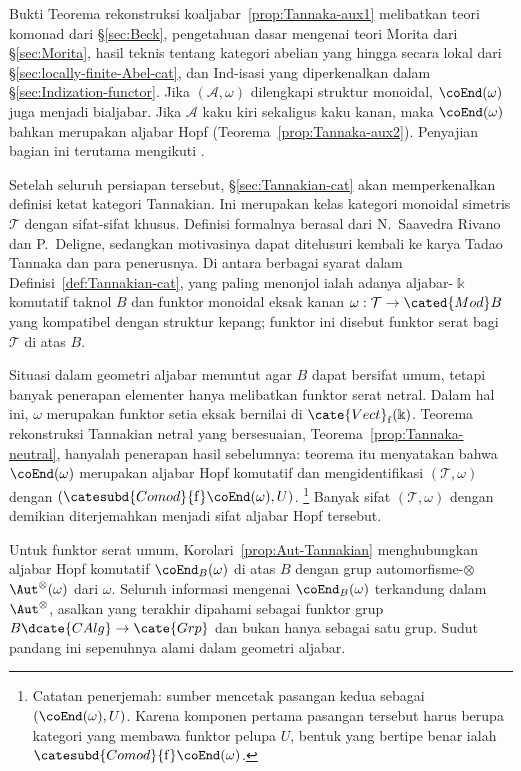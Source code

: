 Bukti Teorema rekonstruksi koaljabar~\ref{prop:Tannaka-aux1} melibatkan teori
komonad dari \S\ref{sec:Beck}, pengetahuan dasar mengenai teori Morita dari
\S\ref{sec:Morita}, hasil teknis tentang kategori abelian yang hingga secara lokal
dari \S\ref{sec:locally-finite-Abel-cat}, dan Ind-isasi yang diperkenalkan
dalam \S\ref{sec:Indization-functor}. Jika $(\mathcal{A},\omega)$ dilengkapi
struktur monoidal, $\coEnd(\omega)$ juga menjadi bialjabar. Jika
$\mathcal{A}$ kaku kiri sekaligus kaku kanan, maka $\coEnd(\omega)$ bahkan
merupakan aljabar Hopf (Teorema~\ref{prop:Tannaka-aux2}). Penyajian bagian ini
terutama mengikuti \cite{Del90}.

Setelah seluruh persiapan tersebut, \S\ref{sec:Tannakian-cat} akan
memperkenalkan definisi ketat kategori Tannakian. Ini merupakan kelas kategori
monoidal simetris $\mathcal{T}$ dengan sifat-sifat khusus. Definisi formalnya
berasal dari N.\ Saavedra Rivano dan P.\ Deligne, sedangkan motivasinya dapat
ditelusuri kembali ke karya Tadao Tannaka dan para penerusnya. Di antara
berbagai syarat dalam Definisi~\ref{def:Tannakian-cat}, yang paling menonjol
ialah adanya aljabar-$\Bbbk$ komutatif taknol $B$ dan funktor monoidal eksak
kanan
$\omega:\mathcal{T}\to\cated{Mod}B$ yang kompatibel dengan struktur kepang;
funktor ini disebut funktor serat bagi $\mathcal{T}$ di atas $B$.

Situasi dalam geometri aljabar menuntut agar $B$ dapat bersifat umum, tetapi
banyak penerapan elementer hanya melibatkan funktor serat netral. Dalam hal
ini, $\omega$ merupakan funktor setia eksak bernilai di
$\cate{Vect}_{\mathrm{f}}(\Bbbk)$. Teorema rekonstruksi Tannakian netral yang
bersesuaian, Teorema~\ref{prop:Tannaka-neutral}, hanyalah penerapan hasil
sebelumnya: teorema itu menyatakan bahwa $\coEnd(\omega)$ merupakan aljabar
Hopf komutatif dan mengidentifikasi $(\mathcal{T},\omega)$ dengan
$(\catesubd{Comod}{\mathrm{f}}\coEnd(\omega),U)$.
\footnote{Catatan penerjemah: sumber mencetak pasangan kedua sebagai
$(\coEnd(\omega),U)$. Karena komponen pertama pasangan tersebut harus berupa
kategori yang membawa funktor pelupa $U$, bentuk yang bertipe benar ialah
$\catesubd{Comod}{\mathrm{f}}\coEnd(\omega)$.}
Banyak sifat $(\mathcal{T},\omega)$ dengan demikian diterjemahkan menjadi
sifat aljabar Hopf tersebut.

Untuk funktor serat umum, Korolari~\ref{prop:Aut-Tannakian} menghubungkan
aljabar Hopf komutatif $\coEnd_B(\omega)$ di atas $B$ dengan grup
automorfisme-$\otimes$ $\Aut^\otimes(\omega)$ dari $\omega$. Seluruh informasi
mengenai $\coEnd_B(\omega)$ terkandung dalam $\Aut^\otimes$, asalkan yang
terakhir dipahami sebagai funktor grup
$B\dcate{CAlg}\to\cate{Grp}$ dan bukan hanya sebagai satu grup. Sudut pandang
ini sepenuhnya alami dalam geometri aljabar.

